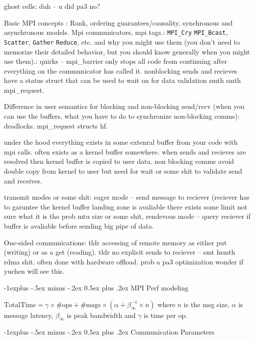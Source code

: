 \documentclass[letter,8pt,landscape]{article}
\makeatletter
\renewcommand{\subsection}{\@startsection{subsection}{2}{0mm}%
                                {-1explus -.5ex minus -.2ex}%
                                {0.5ex plus .2ex}%
                                {\normalfont\normalsize\bfseries}}
\makeatother
\begin{document}
\begin{multicols}{3}
  ghost cells: duh -- u did pa3 no?

  Basic MPI concepts : Rank, ordering guarantees/causality, synchronous and 
  asynchronous models. Mpi communicators, mpi tags.: \verb|MPI_Cry|
  \verb|MPI_Bcast|, \verb|Scatter|, \verb|Gather| \verb|Reduce|, etc.  and why you might use them (you don’t 
  need to memorize their detailed behavior, but you should know generally when 
  you might use them).: 
  quirks -- mpi\_barrier only stops all code from continuing after everything on
  the communicator has called it. nonblocking sends and recieves have a status
  struct that can be used to wait on for data validation smth smth mpi\_request.

  Difference in user semantics for blocking and non-blocking send/recv (when you
  can use the buffers, what you have to do to synchronize non-blocking comms):
  deadlocks. mpi\_request structs hf.
  
  under the hood everything exists in some extenral buffer from your code with
  mpi calls. often exists as a kernel buffer somewhere. when sends and recieves
  are resolved then kernel buffer is copied to user data. non blocking comms
  avoid double copy from kernel to user but need for wait or some shit to
  validate send and receives.

  transmit modes or some shit: eager mode -- send message to reciever (reciever
  has to garuntee the kernel buffer landing zone is avaliable there exists some
  limit not sure what it is tho prob mtu size or some shit, rendevous mode --
  query reciever if buffer is avaliable before sending big pipe of data.
   
  One-sided communications: tldr accessing of remote memory as either put
  (writing) or as a get (reading). tldr no explicit sends to reciever -- smt
  hsmth rdma shit. often done with hardware offload. prob a pa3 optimization
  wonder if yuchen will see this. 

  \subsection{MPI Perf modeling}

  $\text{TotalTime} = \gamma \times \#\text{ops}  +  \#\text{msgs} \times (\alpha +
  \beta^{-1}_\infty \times n)$  where $n$ is the msg size, $\alpha$ is message
  latency, $\beta_\infty$ is peak bandwidth and $\gamma$ is time per op.

  \subsection{Communication Parameters}


\end{multicols}
\end{document}
